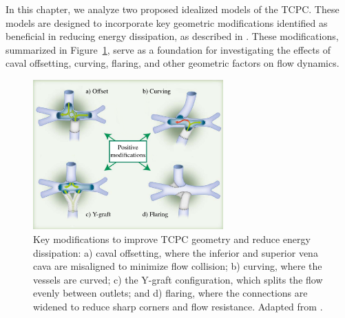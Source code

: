 In this chapter, we analyze two proposed idealized models of the TCPC. These models are designed to incorporate key geometric modifications identified as beneficial in reducing energy dissipation, as described in \cite{Rijnberg2018}. These modifications, summarized in Figure~\ref{fig:positive_modifications}, serve as a foundation for investigating the effects of caval offsetting, curving, flaring, and other geometric factors on flow dynamics.

\begin{figure}[H]
	\centering
	\vspace{3mm}
	\includegraphics[width=0.65\textwidth]{figures/energyloss-en.pdf}
	\vspace{3mm}
	\caption[Positive Modifications for TCPC]{Key modifications to improve TCPC geometry and reduce energy dissipation: a) caval offsetting, where the inferior and superior vena cava are misaligned to minimize flow collision; b) curving, where the vessels are curved; c) the Y-graft configuration, which splits the flow evenly between outlets; and d) flaring, where the connections are widened to reduce sharp corners and flow resistance. Adapted from \cite{Rijnberg2018}.}
	\label{fig:positive_modifications}
\end{figure}


